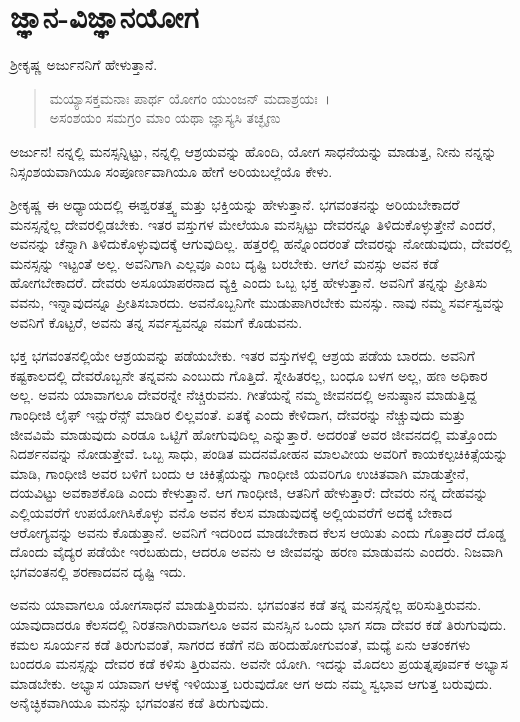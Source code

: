 
\chapter{ಜ್ಞಾನ-ವಿಜ್ಞಾನಯೋಗ}

ಶ‍್ರೀಕೃಷ್ಣ ಅರ್ಜುನನಿಗೆ ಹೇಳುತ್ತಾನೆ.

\begin{verse}
ಮಯ್ಯಾಸಕ್ತಮನಾಃ ಪಾರ್ಥ ಯೋಗಂ ಯುಂಜನ್ ಮದಾಶ್ರಯಃ~।\\ಅಸಂಶಯಂ ಸಮಗ್ರಂ ಮಾಂ ಯಥಾ ಜ್ಞಾಸ್ಯಸಿ ತಚ್ಛೃಣು 
\end{verse}

{\small ಅರ್ಜುನ! ನನ್ನಲ್ಲಿ ಮನಸ್ಸನ್ನಿಟ್ಟು, ನನ್ನಲ್ಲಿ ಆಶ್ರಯವನ್ನು ಹೊಂದಿ, ಯೋಗ ಸಾಧನೆಯನ್ನು ಮಾಡುತ್ತ, ನೀನು ನನ್ನನ್ನು ನಿಸ್ಸಂಶಯವಾಗಿಯೂ ಸಂಪೂರ್ಣವಾಗಿಯೂ ಹೇಗೆ ಅರಿಯಬಲ್ಲೆಯೊ ಕೇಳು.}

ಶ‍್ರೀಕೃಷ್ಣ ಈ ಅಧ್ಯಾಯದಲ್ಲಿ ಈಶ್ವರತತ್ತ್ವ ಮತ್ತು ಭಕ್ತಿಯನ್ನು ಹೇಳುತ್ತಾನೆ. ಭಗವಂತನನ್ನು ಅರಿಯಬೇಕಾದರೆ ಮನಸ್ಸನ್ನೆಲ್ಲ ದೇವರಲ್ಲಿಡಬೇಕು. ಇತರ ವಸ್ತುಗಳ ಮೇಲೆಯೂ ಮನಸ್ಸಿಟ್ಟು ದೇವರನ್ನೂ ತಿಳಿದುಕೊಳ್ಳುತ್ತೇನೆ ಎಂದರೆ, ಅವನನ್ನು ಚೆನ್ನಾಗಿ ತಿಳಿದುಕೊಳ್ಳುವುದಕ್ಕೆ ಆಗುವುದಿಲ್ಲ. ಹತ್ತರಲ್ಲಿ ಹನ್ನೊಂದರಂತೆ ದೇವರನ್ನು ನೋಡುವುದು, ದೇವರಲ್ಲಿ ಮನಸ್ಸನ್ನು ಇಟ್ಟಂತೆ ಅಲ್ಲ. ಅವನಿಗಾಗಿ ಎಲ್ಲವೂ ಎಂಬ ದೃಷ್ಟಿ ಬರಬೇಕು. ಆಗಲೆ ಮನಸ್ಸು ಅವನ ಕಡೆ ಹೋಗಬೇಕಾದರೆ. ದೇವರು ಅಸೂಯಾಪರನಾದ ವ್ಯಕ್ತಿ ಎಂದು ಒಬ್ಬ ಭಕ್ತ ಹೇಳುತ್ತಾನೆ. ಅವನಿಗೆ ತನ್ನನ್ನು ಪ್ರೀತಿಸು ವವನು, ಇನ್ನಾವುದನ್ನೂ ಪ್ರೀತಿಸಬಾರದು. ಅವನೊಬ್ಬನಿಗೇ ಮುಡುಪಾಗಿರಬೇಕು ಮನಸ್ಸು. ನಾವು ನಮ್ಮ ಸರ್ವಸ್ವವನ್ನು ಅವನಿಗೆ ಕೊಟ್ಟರೆ, ಅವನು ತನ್ನ ಸರ್ವಸ್ವವನ್ನೂ ನಮಗೆ ಕೊಡುವನು.

ಭಕ್ತ ಭಗವಂತನಲ್ಲಿಯೇ ಆಶ್ರಯವನ್ನು ಪಡೆಯಬೇಕು. ಇತರ ವಸ್ತುಗಳಲ್ಲಿ ಆಶ್ರಯ ಪಡೆಯ ಬಾರದು. ಅವನಿಗೆ ಕಷ್ಟಕಾಲದಲ್ಲಿ ದೇವರೊಬ್ಬನೇ ತನ್ನವನು ಎಂಬುದು ಗೊತ್ತಿದೆ. ಸ್ನೇಹಿತರಲ್ಲ, ಬಂಧೂ ಬಳಗ ಅಲ್ಲ, ಹಣ ಅಧಿಕಾರ ಅಲ್ಲ. ಅವನು ಯಾವಾಗಲೂ ದೇವರನ್ನೇ ನೆಚ್ಚಿರುವನು. ಗೀತೆಯನ್ನೆ ನಮ್ಮ ಜೀವನದಲ್ಲಿ ಅನುಷ್ಠಾನ ಮಾಡುತ್ತಿದ್ದ ಗಾಂಧೀಜಿ ಲೈಫ್ ಇನ್ಷುರೆನ್ಸ್ ಮಾಡಿರ ಲಿಲ್ಲವಂತೆ. ಏತಕ್ಕೆ ಎಂದು ಕೇಳಿದಾಗ, ದೇವರನ್ನು ನೆಚ್ಚುವುದು ಮತ್ತು ಜೀವವಿಮೆ ಮಾಡುವುದು ಎರಡೂ ಒಟ್ಟಿಗೆ ಹೋಗುವುದಿಲ್ಲ ಎನ್ನುತ್ತಾರೆ. ಅದರಂತೆ ಅವರ ಜೀವನದಲ್ಲಿ ಮತ್ತೊಂದು ನಿದರ್ಶನವನ್ನು ನೋಡುತ್ತೇವೆ. ಒಬ್ಬ ಸಾಧು, ಪಂಡಿತ ಮದನಮೋಹನ ಮಾಲವೀಯ ಅವರಿಗೆ ಕಾಯಕಲ್ಪಚಿಕಿತ್ಸೆಯನ್ನು ಮಾಡಿ, ಗಾಂಧೀಜಿ ಅವರ ಬಳಿಗೆ ಬಂದು ಆ ಚಿಕಿತ್ಸೆಯನ್ನು ಗಾಂಧೀಜಿ ಯವರಿಗೂ ಉಚಿತವಾಗಿ ಮಾಡುತ್ತೇನೆ, ದಯವಿಟ್ಟು ಅವಕಾಶಕೊಡಿ ಎಂದು ಕೇಳುತ್ತಾನೆ. ಆಗ ಗಾಂಧೀಜಿ, ಆತನಿಗೆ ಹೇಳುತ್ತಾರೆ: ದೇವರು ನನ್ನ ದೇಹವನ್ನು ಎಲ್ಲಿಯವರೆಗೆ ಉಪಯೋಗಿಸಿಕೊಳ್ಳು ವನೊ ಅವನ ಕೆಲಸ ಮಾಡುವುದಕ್ಕೆ ಅಲ್ಲಿಯವರೆಗೆ ಅದಕ್ಕೆ ಬೇಕಾದ ಆರೋಗ್ಯವನ್ನು ಅವನು ಕೊಡುತ್ತಾನೆ. ಅವನಿಗೆ ಇದರಿಂದ ಮಾಡಬೇಕಾದ ಕೆಲಸ ಆಯಿತು ಎಂದು ಗೊತ್ತಾದರೆ ದೊಡ್ಡ ದೊಂದು ವೈದ್ಯರ ಪಡೆಯೇ ಇರಬಹುದು, ಆದರೂ ಅವನು ಆ ಜೀವವನ್ನು ಹರಣ ಮಾಡುವನು ಎಂದರು. ನಿಜವಾಗಿ ಭಗವಂತನಲ್ಲಿ ಶರಣಾದವನ ದೃಷ್ಟಿ ಇದು.

ಅವನು ಯಾವಾಗಲೂ ಯೋಗಸಾಧನೆ ಮಾಡುತ್ತಿರುವನು. ಭಗವಂತನ ಕಡೆ ತನ್ನ ಮನಸ್ಸನ್ನೆಲ್ಲ ಹರಿಸುತ್ತಿರುವನು. ಯಾವುದಾದರೂ ಕೆಲಸದಲ್ಲಿ ನಿರತನಾಗಿರುವಾಗಲೂ ಅವನ ಮನಸ್ಸಿನ ಒಂದು ಭಾಗ ಸದಾ ದೇವರ ಕಡೆ ತಿರುಗುವುದು. ಕಮಲ ಸೂರ್ಯನ ಕಡೆ ತಿರುಗುವಂತೆ, ಸಾಗರದ ಕಡೆಗೆ ನದಿ ಹರಿದುಹೋಗುವಂತೆ, ಮಧ್ಯೆ ಏನು ಆತಂಕಗಳು ಬಂದರೂ ಮನಸ್ಸನ್ನು ದೇವರ ಕಡೆ ಕಳಿಸು ತ್ತಿರುವನು. ಅವನೇ ಯೋಗಿ. ಇದನ್ನು ಮೊದಲು ಪ್ರಯತ್ನಪೂರ್ವಕ ಅಭ್ಯಾಸ ಮಾಡಬೇಕು. ಅಭ್ಯಾಸ ಯಾವಾಗ ಆಳಕ್ಕೆ ಇಳಿಯುತ್ತ ಬರುವುದೋ ಆಗ ಅದು ನಮ್ಮ ಸ್ವಭಾವ ಆಗುತ್ತ ಬರುವುದು. ಅನೈಚ್ಛಿಕವಾಗಿಯೂ ಮನಸ್ಸು ಭಗವಂತನ ಕಡೆ ತಿರುಗುವುದು.

